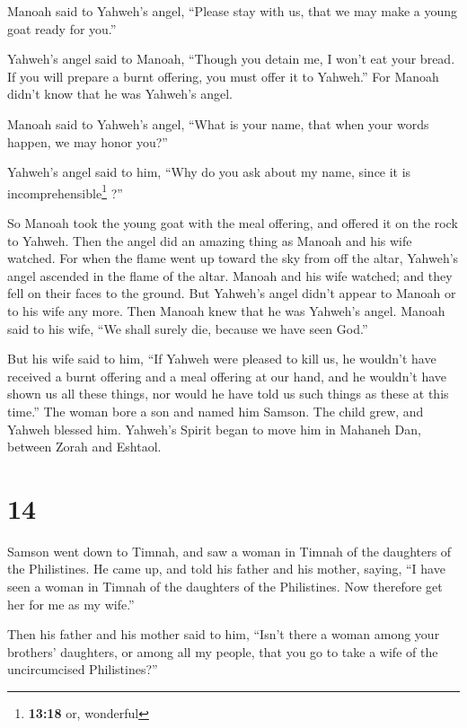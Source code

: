  Manoah said to Yahweh's angel, ``Please stay with us,
that we may make a young goat ready for you.''

 Yahweh's angel said to Manoah, ``Though you detain me, I
won't eat your bread. If you will prepare a burnt offering, you must
offer it to Yahweh.'' For Manoah didn't know that he was Yahweh's angel.

 Manoah said to Yahweh's angel, ``What is your name, that
when your words happen, we may honor you?''

 Yahweh's angel said to him, ``Why do you ask about my
name, since it is incomprehensible\footnote{\textbf{13:18} or, wonderful}
?''

 So Manoah took the young goat with the meal offering,
and offered it on the rock to Yahweh. Then the angel did an amazing
thing as Manoah and his wife watched.  For when the flame
went up toward the sky from off the altar, Yahweh's angel ascended in
the flame of the altar. Manoah and his wife watched; and they fell on
their faces to the ground.  But Yahweh's angel didn't
appear to Manoah or to his wife any more. Then Manoah knew that he was
Yahweh's angel.  Manoah said to his wife, ``We shall
surely die, because we have seen God.''

 But his wife said to him, ``If Yahweh were pleased to
kill us, he wouldn't have received a burnt offering and a meal offering
at our hand, and he wouldn't have shown us all these things, nor would
he have told us such things as these at this time.''  The
woman bore a son and named him Samson. The child grew, and Yahweh
blessed him.  Yahweh's Spirit began to move him in
Mahaneh Dan, between Zorah and Eshtaol.

\hypertarget{section-13}{%
\section{14}\label{section-13}}

 Samson went down to Timnah, and saw a woman in Timnah of
the daughters of the Philistines.  He came up, and told
his father and his mother, saying, ``I have seen a woman in Timnah of
the daughters of the Philistines. Now therefore get her for me as my
wife.''

 Then his father and his mother said to him, ``Isn't there
a woman among your brothers' daughters, or among all my people, that you
go to take a wife of the uncircumcised Philistines?''


